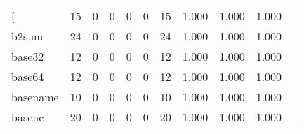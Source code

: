 \begin{longtable}{lp{1.20cm}p{1.20cm}p{1.20cm}p{1.20cm}p{1.20cm}p{1.20cm}p{1.20cm}p{1.20cm}p{1.20cm}p{1.20cm}}
\bottomrule
\endlastfoot
{[}         &                                    15 &                                                  0 &                                                  0 &                                                  0 &                                                  0 &                                                 15 &                                         1.000 &                                              1.000 &                                              1.000 \\
b2sum     &                                    24 &                                                  0 &                                                  0 &                                                  0 &                                                  0 &                                                 24 &                                         1.000 &                                              1.000 &                                              1.000 \\
base32    &                                    12 &                                                  0 &                                                  0 &                                                  0 &                                                  0 &                                                 12 &                                         1.000 &                                              1.000 &                                              1.000 \\
base64    &                                    12 &                                                  0 &                                                  0 &                                                  0 &                                                  0 &                                                 12 &                                         1.000 &                                              1.000 &                                              1.000 \\
basename  &                                    10 &                                                  0 &                                                  0 &                                                  0 &                                                  0 &                                                 10 &                                         1.000 &                                              1.000 &                                              1.000 \\
basenc    &                                    20 &                                                  0 &                                                  0 &                                                  0 &                                                  0 &                                                 20 &                                         1.000 &                                              1.000 &                                              1.000 \\

\end{longtable}
